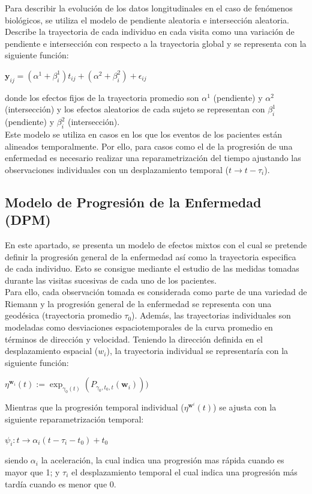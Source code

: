 	Para describir la evolución de los datos longitudinales en el caso de fenómenos biológicos, se utiliza el modelo de pendiente aleatoria e intersección aleatoria. Describe la trayectoria de cada individuo en cada visita como una variación de pendiente e intersección con respecto a la trayectoria global y se representa con la siguiente función:
	\begin{center}
		$\textbf{y}_{ij}=(\alpha^{1}+\beta_{i}^{1})t_{ij}+(\alpha^{2}+\beta_{i}^{2})+\epsilon_{ij}$
	\end{center}
	donde los efectos fijos de la trayectoria promedio son $\alpha^{1}$ (pendiente) y $\alpha^{2}$ (intersección) y los efectos aleatorios de cada sujeto se representan con $\beta_{i}^{1}$ (pendiente) y $\beta_{i}^{2}$ (intersección).\\
	
	Este modelo se utiliza en casos en los que los eventos de los pacientes están alineados temporalmente. Por ello, para casos como el de la progresión de una enfermedad es necesario realizar una reparametrización del tiempo ajustando las observaciones individuales con un desplazamiento temporal ($t \rightarrow t-\tau_{i}$).
	
	\subsection{Modelo de Progresión de la Enfermedad (DPM)}
	En este apartado, se presenta un modelo de efectos mixtos con el cual se pretende definir la progresión general de la enfermedad así como la trayectoria especifica de cada individuo. Esto se consigue mediante el estudio de las medidas tomadas durante las visitas sucesivas de cada uno de los pacientes.\\
	
	Para ello, cada observación tomada es considerada como parte de una variedad de Riemann y la progresión general de la enfermedad se representa con una geodésica (trayectoria promedio $\tau_{0}$). Además, las trayectorias individuales son modeladas como desviaciones espaciotemporales de la curva promedio en términos de dirección y velocidad. Teniendo la dirección definida en el desplazamiento espacial ($w_{i}$), la trayectoria individual se representaría con la siguiente función:
	\begin{center}
		$\eta^{\textbf{w}_{i}}(t):=\exp_{\gamma_0(t)} (P_{\gamma_0,t_0,t}(\textbf{w}_i)))$
	\end{center}
	Mientras que la progresión temporal individual ($\eta^{\textbf{w}^{i}}(t)$) se ajusta con la siguiente reparametrización temporal:
	\begin{center}
		$\psi_i:t \rightarrow \alpha_i(t - \tau_i - t_0) + t_0$
	\end{center}
	siendo $\alpha_i$ la aceleración, la cual indica una progresión mas rápida cuando es mayor que 1; y $\tau_{i}$ el desplazamiento temporal el cual indica una progresión más tardía cuando es menor que 0.\\
	
